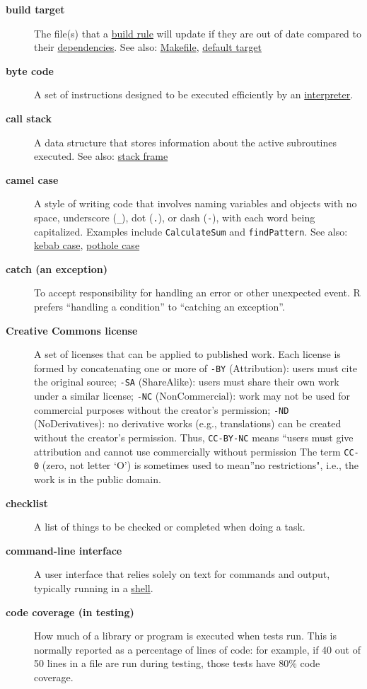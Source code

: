 \documentclass[
]{krantz}
\begin{document}
\begin{description}
\item[\textbf{build target}]
The file(s) that a \protect\hyperlink{build_rule}{build rule} will update if they are out of date compared to their \protect\hyperlink{dependency}{dependencies}. See also: \protect\hyperlink{makefile}{Makefile}, \protect\hyperlink{default_target}{default target}
\item[\textbf{byte code}]
A set of instructions designed to be executed efficiently by an \protect\hyperlink{interpreter}{interpreter}.
\item[\textbf{call stack}]
A data structure that stores information about the active subroutines executed. See also: \protect\hyperlink{stack_frame}{stack frame}
\item[\textbf{camel case}]
A style of writing code that involves naming variables and objects with no space, underscore (\texttt{\_}), dot (\texttt{.}), or dash (\texttt{-}), with each word being capitalized. Examples include \texttt{CalculateSum} and \texttt{findPattern}. See also: \protect\hyperlink{kebab_case}{kebab case}, \protect\hyperlink{pothole_case}{pothole case}
\item[\textbf{catch (an exception)}]
To accept responsibility for handling an error or other unexpected event. R prefers ``handling a condition'' to ``catching an exception''.
\item[\textbf{Creative Commons license}]
A set of licenses that can be applied to published work. Each license is formed by concatenating one or more of \texttt{-BY} (Attribution): users must cite the original source; \texttt{-SA} (ShareAlike): users must share their own work under a similar license; \texttt{-NC} (NonCommercial): work may not be used for commercial purposes without the creator's permission; \texttt{-ND} (NoDerivatives): no derivative works (e.g., translations) can be created without the creator's permission. Thus, \texttt{CC-BY-NC} means ``users must give attribution and cannot use commercially without permission The term \texttt{CC-0} (zero, not letter `O') is sometimes used to mean''no restrictions", i.e., the work is in the public domain.
\item[\textbf{checklist}]
A list of things to be checked or completed when doing a task.
\item[\textbf{command-line interface}]
A user interface that relies solely on text for commands and output, typically running in a \protect\hyperlink{shell}{shell}.
\item[\textbf{code coverage (in testing)}]
How much of a library or program is executed when tests run. This is normally reported as a percentage of lines of code: for example, if 40 out of 50 lines in a file are run during testing, those tests have 80\% code coverage.

\end{description}
\end{document}
